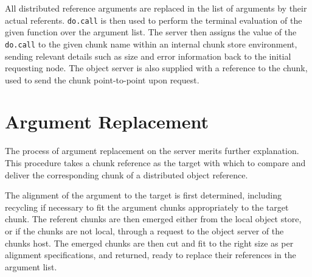 \documentclass[a4paper,10pt]{article}
\begin{document}
All distributed reference arguments are replaced in the list of arguments by
their actual referents.
\texttt{do.call} is then used to perform the terminal evaluation of
the given function over the argument list.
The server then assigns the value of the \texttt{do.call} to the given
chunk name within an internal chunk store environment, sending relevant
details such as size and error information back to the initial requesting node. 
The object server is also supplied with a reference to the chunk, used to send
the chunk point-to-point upon request.

\section{Argument Replacement}

The process of argument replacement on the server merits further explanation.
This procedure takes a chunk reference as the target with which to compare and
deliver the corresponding chunk of a distributed object reference.

The alignment of the argument to the target is first determined, including
recycling if necessary to fit the argument chunks appropriately to the target
chunk. The referent chunks are then emerged either from the local object store,
or if the chunks are not local, through a request to the object server of the
chunks host.
The emerged chunks are then cut and fit to the right size as per alignment
specifications, and returned, ready to replace their references in the argument
list.
\end{document}
